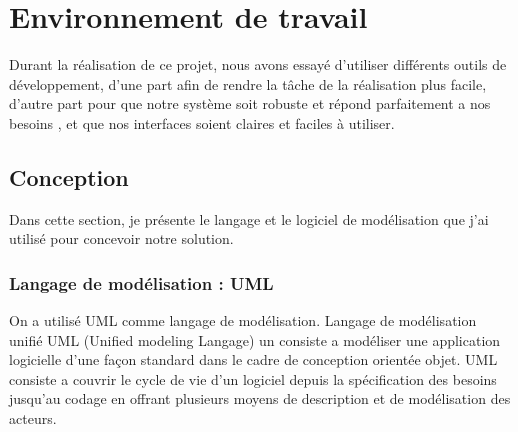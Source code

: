 \chapter{Environnement de travail}
\label{sec:EnvironnementDeTravail}
Durant la réalisation de ce projet, nous avons essayé d’utiliser différents
outils de développement, d’une part afin de rendre la tâche de la
réalisation plus facile, d’autre part pour que notre système soit robuste et
répond parfaitement a nos besoins , et que nos interfaces soient claires et
faciles à utiliser.
\section{Conception}
Dans cette section, je présente le langage et le logiciel de modélisation que j’ai utilisé pour concevoir
notre solution.
\subsection{Langage de modélisation : UML}
On a utilisé UML comme langage de modélisation.
Langage de modélisation unifié UML (Unified modeling Langage) un
consiste a modéliser une application logicielle d'une façon standard
dans le cadre de conception orientée objet.
UML consiste a couvrir le cycle de vie d'un logiciel depuis la
spécification des besoins jusqu'au codage en offrant plusieurs
moyens de description et de modélisation des acteurs.
